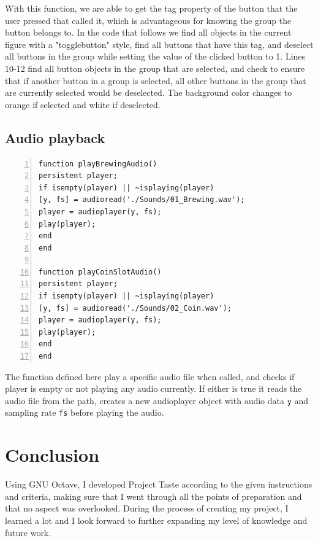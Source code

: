 \documentclass[a4paper, 11pt]{article}
\begin{document}
\noindent With this function, we are able to get the tag property of the button that the user pressed that called it, which is advantageous for knowing the group the button belongs to. In the code that follows we find all objects in the current figure with a "togglebutton" style, find all buttons that have this tag, and deselect all buttons in the group while setting the value of the clicked button to 1. Lines 10-12 find all button objects in the group that are selected, and check to ensure that if another button in a group is selected, all other buttons in the group that are currently selected would be deselected. The background color changes to orange if selected and white if deselected.
\vspace{5mm}

\subsection{Audio playback}
\begin{lstlisting}[style=Matlab-editor, numbers = left, frame = single]
% Playing brewing sound
function playBrewingAudio()
persistent player;
if isempty(player) || ~isplaying(player)
[y, fs] = audioread('./Sounds/01_Brewing.wav');
player = audioplayer(y, fs);
play(player);
end
end

function playCoinSlotAudio()
persistent player;
if isempty(player) || ~isplaying(player)
[y, fs] = audioread('./Sounds/02_Coin.wav');
player = audioplayer(y, fs);
play(player);
end
end
\end{lstlisting}
\vspace{5mm}
\noindent The function defined here play a specific audio file when called, and checks if player is empty or not playing any audio currently. If either is true it reads the audio file from the path, creates a new audioplayer object with audio data \texttt{y} and sampling rate \texttt{fs} before playing the audio.

\section{Conclusion}

\noindent Using GNU Octave, I developed Project Taste according to the given instructions and criteria, making sure that I went through all the points of preparation and that no aspect was overlooked. During the process of creating my project, I learned a lot and I look forward to further expanding my level of knowledge and future work.
\vspace{3mm}
\end{document}
